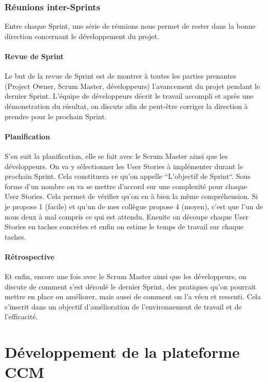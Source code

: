 \documentclass[12pt, a4paper]{report}
\begin{document}
\subsection{Réunions inter-Sprints}
Entre chaque Sprint, une série de réunions nous permet de rester dans la bonne direction concernant le développement du projet.
\subsubsection{Revue de Sprint}
Le but de la revue de Sprint est de montrer à toutes les parties prenantes (Project Owner, Scrum Master, développeurs) l'avancement du projet pendant le dernier Sprint.\newline
L'équipe de développeurs décrit le travail accompli et après une démonstration du résultat, on discute afin de peut-être corriger la direction à prendre pour le prochain Sprint.
\subsubsection{Planification}
S'en suit la planification, elle se fait avec le Scrum Master ainsi que les développeurs.\newline
On va y sélectionner les User Stories à implémenter durant le prochain Sprint. Cela constituera ce qu'on appelle ``L'objectif de Sprint``.\newline
Sous forme d'un nombre on va se mettre d'accord sur une complexité pour chaque User Stories. Cela permet de vérifier qu'on en à bien la même compréhension. Si je propose 1 (facile) et qu'un de mes collègue propose 4 (moyen), c'est que l'un de nous deux à mal compris ce qui est attendu.\newline
Ensuite on découpe chaque User Stories en taches concrètes et enfin on estime le temps de travail sur chaque taches.
\subsubsection{Rétrospective}
Et enfin, encore une fois avec le Scrum Master ainsi que les développeurs, on discute de comment s'est déroulé le dernier Sprint, des pratiques qu'on pourrait mettre en place ou améliorer, mais aussi de comment on l'a vécu et ressenti.\newline
Cela s'inscrit dans un objectif d'amélioration de l'environnement de travail et de l'efficacité.

\chapter{Développement de la plateforme CCM}
\end{document}
